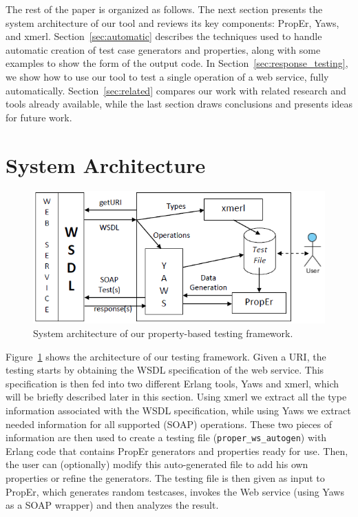 \documentclass[submission,copyright]{eptcs}
\begin{document}

The rest of the paper is organized as follows.
The next section presents the system architecture of our tool and
reviews its key components: PropEr, Yaws, and xmerl.
Section~\ref{sec:automatic} describes the techniques used to handle
automatic creation of test case generators and properties, along with
some examples to show the form of the output code.
In Section~\ref{sec:response_testing}, we show how to use our tool to
test a single operation of a web service, fully automatically.
Section~\ref{sec:related} compares our work with related research and
tools already available, while the last section draws conclusions and
presents ideas for future work.

\section{System Architecture} \label{sec:architecture}

\begin{figure}[!b]
\centering
\includegraphics[height=.245\textheight]{Framework.png}
\caption{System architecture of our property-based testing framework.}
\label{fig:architecture}
\end{figure}

Figure~\ref{fig:architecture} shows the architecture of our testing
framework. Given a URI, the testing starts by obtaining the WSDL
specification of the web service. This specification is then fed into
two different Erlang tools, Yaws and xmerl, which will be briefly
described later in this section. Using xmerl we extract all the type
information associated with the WSDL specification, while using Yaws
we extract needed information for all supported (SOAP) operations.
These two pieces of information are then used to create a testing file
(\texttt{proper\_ws\_autogen}) with Erlang code that contains PropEr
generators and properties ready for use. Then, the user can
(optionally) modify this auto-generated file to add his own properties
or refine the generators. The testing file is then given as input to
PropEr, which generates random testcases, invokes the Web service
(using Yaws as a SOAP wrapper) and then analyzes the result.
\end{document}
